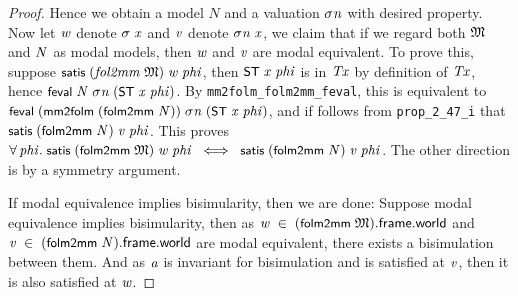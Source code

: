 \documentclass[letterpaper]{article}
\renewcommand{\HOLConst}[1]{{\textsf{\upshape\small #1}}}
\renewcommand{\HOLinline}[1]{\ensuremath{#1}}
\begin{document}
\begin{proof}
Hence we obtain a model $N$ and a valuation \HOLinline{\HOLFreeVar{\ensuremath{\sigma}n}} with desired property. Now let \HOLinline{\HOLFreeVar{w}} denote \HOLinline{\HOLFreeVar{\ensuremath{\sigma}}\;\HOLFreeVar{x}} and \HOLinline{\HOLFreeVar{v}} denote \HOLinline{\HOLFreeVar{\ensuremath{\sigma}n}\;\HOLFreeVar{x}}, we claim that if we regard both \HOLinline{\HOLFreeVar{\ensuremath{\mathfrak{M}}}} and \HOLinline{\HOLFreeVar{N}} as modal models, then \HOLinline{\HOLFreeVar{w}} and \HOLinline{\HOLFreeVar{v}} are modal equivalent. To prove this, suppose \HOLinline{\HOLConst{satis}\;(\HOLFreeVar{fol2mm}\;\HOLFreeVar{\ensuremath{\mathfrak{M}}})\;\HOLFreeVar{w}\;\HOLFreeVar{phi}}, then \HOLinline{\HOLConst{ST}\;\HOLFreeVar{x}\;\HOLFreeVar{phi}} is in \HOLinline{\HOLFreeVar{Tx}} by definition of \HOLinline{\HOLFreeVar{Tx}}, hence \HOLinline{\HOLConst{feval}\;\HOLFreeVar{N}\;\HOLFreeVar{\ensuremath{\sigma}n}\;(\HOLConst{ST}\;\HOLFreeVar{x}\;\HOLFreeVar{phi})}. By \texttt{mm2folm_folm2mm_feval}, this is equivalent to \HOLinline{\HOLConst{feval}\;(\HOLConst{mm2folm}\;(\HOLConst{folm2mm}\;\HOLFreeVar{N}))\;\HOLFreeVar{\ensuremath{\sigma}n}\;(\HOLConst{ST}\;\HOLFreeVar{x}\;\HOLFreeVar{phi})}, and if follows from \texttt{prop_2_47_i} that \HOLinline{\HOLConst{satis}\;(\HOLConst{folm2mm}\;\HOLFreeVar{N})\;\HOLFreeVar{v}\;\HOLFreeVar{phi}}. This proves \HOLinline{\HOLSymConst{\HOLTokenForall{}}\HOLBoundVar{phi}.\;\HOLConst{satis}\;(\HOLConst{folm2mm}\;\HOLFreeVar{\ensuremath{\mathfrak{M}}})\;\HOLFreeVar{w}\;\HOLBoundVar{phi}\;\HOLSymConst{\HOLTokenEquiv{}}\;\HOLConst{satis}\;(\HOLConst{folm2mm}\;\HOLFreeVar{N})\;\HOLFreeVar{v}\;\HOLBoundVar{phi}}. The other direction is by a symmetry argument. 

If modal equivalence implies bisimularity, then we are done: Suppose modal equivalence implies bisimularity, then as \HOLinline{\HOLFreeVar{w}\;\HOLSymConst{\HOLTokenIn{}}\;(\HOLConst{folm2mm}\;\HOLFreeVar{\ensuremath{\mathfrak{M}}}).\HOLFieldName{frame}.\HOLFieldName{world}} and \HOLinline{\HOLFreeVar{v}\;\HOLSymConst{\HOLTokenIn{}}\;(\HOLConst{folm2mm}\;\HOLFreeVar{N}).\HOLFieldName{frame}.\HOLFieldName{world}} are modal equivalent, there exists a bisimulation between them. And as \HOLinline{\HOLFreeVar{a}} is invariant for bisimulation and is satisfied at \HOLinline{\HOLFreeVar{v}}, then it is also satisfied at \HOLinline{\HOLFreeVar{w}}. 


\end{proof}
\end{document}
